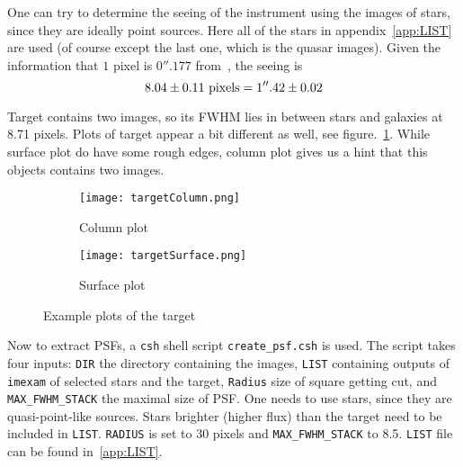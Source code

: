 One can try to determine the seeing of the instrument using the images of stars, since they are ideally point sources. Here all of the stars in appendix~\ref{app:LIST} are used (of course except the last one, which is the quasar images). Given the information that $1$ pixel is $0''.177$ from~\cite{manual}, the seeing is
\begin{equation}
	\num{8.04 +- 0.11} \text{ pixels} = 1''.42 \pm 0.02
\end{equation}

Target contains two images, so its FWHM lies in between stars and galaxies at \num{8.71} pixels. Plots of target appear a bit different as well, see figure.~\ref{fig:targetPlots}. While surface plot do have some rough edges, column plot gives us a hint that this objects contains two images.
\begin{figure}[ht]
   \centering
   \begin{subfigure}[t]{0.5\textwidth}
   \begin{center}
   \texttt{[image: targetColumn.png]}
   \end{center}
   \caption{Column plot}
   \end{subfigure}%
   \begin{subfigure}[t]{0.5\textwidth}
   \begin{center}
   \texttt{[image: targetSurface.png]}
   \end{center}
   \caption{Surface plot}
   \end{subfigure}
   \caption{Example plots of the target}%
   \label{fig:targetPlots}
\end{figure}

Now to extract PSFs, a \verb|csh| shell script \verb|create_psf.csh| is used. The script takes four inputs: \verb|DIR| the directory containing the images, \verb|LIST| containing outputs of \verb|imexam| of selected stars and the target, \verb|Radius| size of square getting cut, and \verb|MAX_FWHM_STACK| the maximal size of PSF. One needs to use stars, since they are quasi-point-like sources. Stars brighter (higher flux) than the target need to be included in \verb|LIST|. \verb|RADIUS| is set to \num{30} pixels and \verb|MAX_FWHM_STACK| to \num{8.5}. \verb|LIST| file can be found in~\ref{app:LIST}.


